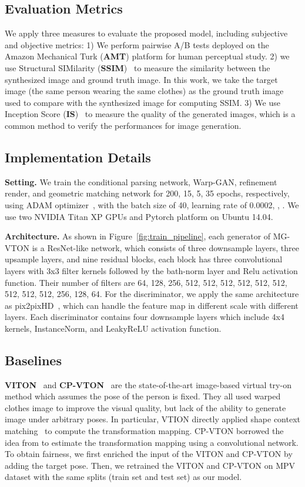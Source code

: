 \documentclass[10pt,twocolumn,letterpaper]{article}
\begin{document}
\subsection{Evaluation Metrics}
We apply three measures to evaluate the proposed model, including subjective and objective metrics:
1) We perform pairwise A/B tests deployed on the Amazon Mechanical Turk (\textbf{AMT}) platform for human perceptual study. 2) we use Structural SIMilarity (\textbf{SSIM})~\cite{wang2004image} to measure the similarity between the synthesized image and ground truth image. In this work, we take the target image (the same person wearing the same clothes) as the ground truth image used to compare with the synthesized image for computing SSIM. 3) We use Inception Score (\textbf{IS})~\cite{NIPS2016_6125} to measure the quality of the generated images, which is a common method to verify the performances for image generation.
 
\subsection{Implementation Details}
\textbf{Setting.}
We train the conditional parsing network, Warp-GAN, refinement render, and geometric matching network for 200, 15, 5, 35 epochs, respectively, using ADAM optimizer~\cite{Diederik2014Adam}, with the batch size of 40, learning rate of 0.0002, , . We use two NVIDIA Titan XP GPUs and Pytorch platform on Ubuntu 14.04.

\textbf{Architecture.}
As shown in Figure~\ref{fig:train_pipeline}, each generator of MG-VTON is a ResNet-like network, which consists of three downsample layers, three upsample layers, and nine residual blocks, each block has three convolutional layers with 3x3 filter kernels followed by the bath-norm layer and Relu activation function. Their number of filters are 64, 128, 256, 512, 512, 512, 512, 512, 512, 512, 512, 512, 256, 128, 64. For the discriminator, we apply the same architecture as pix2pixHD~\cite{wang2017pix2pixHD}, which can handle the feature map in different scale with different layers. Each discriminator contains four downsample layers which include 4x4 kernels, InstanceNorm, and LeakyReLU activation function. 

\subsection{Baselines}
\textbf{VITON}~\cite{han2017viton} and \textbf{CP-VTON}~\cite{wang2018cpvton} are the state-of-the-art image-based virtual try-on method which assumes the pose of the person is fixed. They all used warped clothes image to improve the visual quality, but lack of the ability to generate image under arbitrary poses. In particular, VTION directly applied shape context matching~\cite{belongie2002shape} to compute the transformation mapping. CP-VTON borrowed the idea from \cite{Rocco2017geocnn} to estimate the transformation mapping using a convolutional network. To obtain fairness, we first enriched the input of the VITON and CP-VTON by adding the target pose. Then, we retrained the VITON and CP-VTON on MPV dataset with the same splits (train set and test set) as our model.
\end{document}
